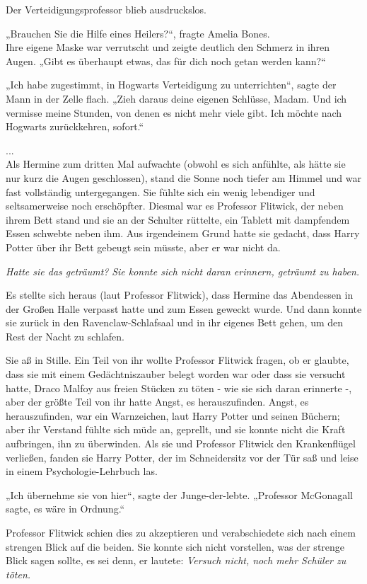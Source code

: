 {Der Verteidigungsprofessor blieb ausdruckslos.

„Brauchen Sie die Hilfe eines Heilers?“, fragte Amelia Bones.\\ Ihre eigene Maske war verrutscht und zeigte deutlich den Schmerz in ihren Augen. „Gibt es überhaupt etwas, das für dich noch getan werden kann?“

„Ich habe zugestimmt, in Hogwarts Verteidigung zu unterrichten“, sagte der Mann in der Zelle flach. „Zieh daraus deine eigenen Schlüsse, Madam. Und ich vermisse meine Stunden, von denen es nicht mehr viele gibt. Ich möchte nach Hogwarts zurückkehren, sofort.“

...\\ Als Hermine zum dritten Mal aufwachte (obwohl es sich anfühlte, als hätte sie nur kurz die Augen geschlossen), stand die Sonne noch tiefer am Himmel und war fast vollständig untergegangen. Sie fühlte sich ein wenig lebendiger und seltsamerweise noch erschöpfter. Diesmal war es Professor Flitwick, der neben ihrem Bett stand und sie an der Schulter rüttelte, ein Tablett mit dampfendem Essen schwebte neben ihm. Aus irgendeinem Grund hatte sie gedacht, dass Harry Potter über ihr Bett gebeugt sein müsste, aber er war nicht da.

\emph{Hatte sie das geträumt?} \emph{Sie konnte sich nicht daran erinnern, geträumt zu haben.}

Es stellte sich heraus (laut Professor Flitwick), dass Hermine das Abendessen in der Großen Halle verpasst hatte und zum Essen geweckt wurde. Und dann konnte sie zurück in den Ravenclaw-Schlafsaal und in ihr eigenes Bett gehen, um den Rest der Nacht zu schlafen.

Sie aß in Stille. Ein Teil von ihr wollte Professor Flitwick fragen, ob er glaubte, dass sie mit einem Gedächtniszauber belegt worden war oder dass sie versucht hatte, Draco Malfoy aus freien Stücken zu töten - wie sie sich daran erinnerte -, aber der größte Teil von ihr hatte Angst, es herauszufinden. Angst, es herauszufinden, war ein Warnzeichen, laut Harry Potter und seinen Büchern; aber ihr Verstand fühlte sich müde an, geprellt, und sie konnte nicht die Kraft aufbringen, ihn zu überwinden. Als sie und Professor Flitwick den Krankenflügel verließen, fanden sie Harry Potter, der im Schneidersitz vor der Tür saß und leise in einem Psychologie-Lehrbuch las.

„Ich übernehme sie von hier“, sagte der Junge-der-lebte. „Professor McGonagall sagte, es wäre in Ordnung.“

Professor Flitwick schien dies zu akzeptieren und verabschiedete sich nach einem strengen Blick auf die beiden. Sie konnte sich nicht vorstellen, was der strenge Blick sagen sollte, es sei denn, er lautete: \emph{Versuch nicht, noch mehr Schüler zu töten.}

}
